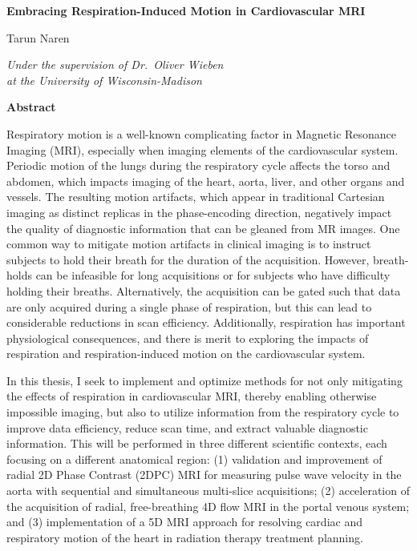\begin{center}
    \Large
    \textbf{Embracing Respiration-Induced Motion in Cardiovascular MRI}

    \vspace{0.4cm}
    \normalsize
    Tarun Naren
    
    \vspace{0.4cm}
    \normalsize
    \textit{Under the supervision of Dr.\ Oliver Wieben \\
    at the University of Wisconsin-Madison}
    
    \vspace{0.9cm}
    \large
    \textbf{Abstract}
\end{center}

\doublespacing{}

Respiratory motion is a well-known complicating factor in Magnetic Resonance Imaging (MRI), especially when imaging elements of the cardiovascular system. Periodic motion of the lungs during the respiratory cycle affects the torso and abdomen, which impacts imaging of the heart, aorta, liver, and other organs and vessels. The resulting motion artifacts, which appear in traditional Cartesian imaging as distinct replicas in the phase-encoding direction, negatively impact the quality of diagnostic information that can be gleaned from MR images. One common way to mitigate motion artifacts in clinical imaging is to instruct subjects to hold their breath for the duration of the acquisition. However, breath-holds can be infeasible for long acquisitions or for subjects who have difficulty holding their breaths. Alternatively, the acquisition can be gated such that data are only acquired during a single phase of respiration, but this can lead to considerable reductions in scan efficiency. Additionally, respiration has important physiological consequences, and there is merit to exploring the impacts of respiration and respiration-induced motion on the cardiovascular system.

In this thesis, I seek to implement and optimize methods for not only mitigating the effects of respiration in cardiovascular MRI, thereby enabling otherwise impossible imaging, but also to utilize information from the respiratory cycle to improve data efficiency, reduce scan time, and extract valuable diagnostic information. This will be performed in three different scientific contexts, each focusing on a different anatomical region: (1) validation and improvement of radial 2D Phase Contrast (2DPC) MRI for measuring pulse wave velocity in the aorta with sequential and simultaneous multi-slice acquisitions; (2) acceleration of the acquisition of radial, free-breathing 4D flow MRI in the portal venous system; and (3) implementation of a 5D MRI approach for resolving cardiac and respiratory motion of the heart in radiation therapy treatment planning.